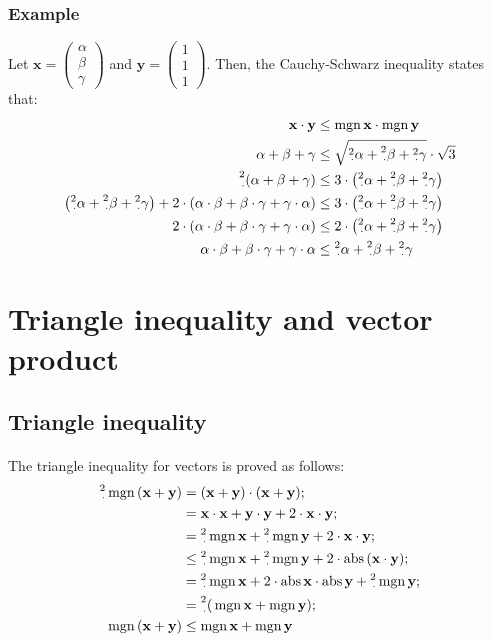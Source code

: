 \documentclass[11pt]{article}
\newcommand*\cd{\cdot}
\newcommand*\prg{\paragraph}
\newcommand*\pt{\prescript}
\DeclareMathOperator{\abs}{abs}
\DeclareMathOperator{\mgn}{mgn}
\begin{document}
\subsubsection{Example}
Let $\mathbf x=\begin{pmatrix}\alpha\\\beta\\\gamma\end{pmatrix}$ and $\mathbf y=\begin{pmatrix}1\\1\\1\end{pmatrix}$. Then, the Cauchy-Schwarz inequality states that:
\[
\begin{aligned}
\mathbf x\cd\mathbf y&\leq\mgn{\mathbf x}\cd\mgn{\mathbf y}\\
\alpha+\beta+\gamma&\leq\sqrt{\pt 2\cd\alpha+\pt 2\cd\beta+\pt 2\cd\gamma}\cd\sqrt{3}\\
\pt 2\cd(\alpha+\beta+\gamma)&\leq 3\cd\left(\pt 2\cd\alpha+\pt 2\cd\beta+\pt 2\cd\gamma\right)\\
\left(\pt 2\cd\alpha+\pt 2\cd\beta+\pt 2\cd\gamma\right)+2\cd\left(\alpha\cd\beta+\beta\cd\gamma+\gamma\cd\alpha\right)&\leq 3\cd\left(\pt 2\cd\alpha+\pt 2\cd\beta+\pt 2\cd\gamma\right)\\
2\cd\left(\alpha\cd\beta+\beta\cd\gamma+\gamma\cd\alpha\right)&\leq 2\cd\left(\pt 2\cd\alpha+\pt 2\cd\beta+\pt 2\cd\gamma\right)\\
\alpha\cd\beta+\beta\cd\gamma+\gamma\cd\alpha&\leq\pt 2\cd\alpha+\pt 2\cd\beta+\pt 2\cd\gamma\\
\end{aligned}
\]

\section{Triangle inequality and vector product}
\subsection{Triangle inequality}
\prg{}The triangle inequality for vectors is proved as follows:
\[
\begin{aligned}
\pt 2\cd{}\mgn{(\mathbf x+\mathbf y)}&=(\mathbf x+\mathbf y)\cd(\mathbf x+\mathbf y);\\
&=\mathbf x\cd\mathbf x+\mathbf y\cd\mathbf y+2\cd\mathbf x\cd\mathbf y;\\
&=\pt 2\cd{}\mgn{\mathbf x}+\pt 2\cd{}\mgn{\mathbf y}+2\cd\mathbf x\cd\mathbf y;\\
&\leq\pt 2\cd{}\mgn{\mathbf x}+\pt 2\cd{}\mgn{\mathbf y}+2\cd\abs{(\mathbf x\cd\mathbf y)};\\
&=\pt 2\cd{}\mgn{\mathbf x}+2\cd\abs{\mathbf x}\cd\abs{\mathbf y}+\pt 2\cd{}\mgn{\mathbf y};\\
&=\pt 2\cd(\mgn{\mathbf x}+\mgn{\mathbf y});\\
\mgn{(\mathbf x+\mathbf y)}&\leq\mgn{\mathbf x}+\mgn{\mathbf y}
\end{aligned}
\]
\end{document}
